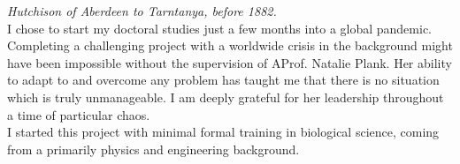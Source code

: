 \documentclass[
  a4paper,
]{scrbook}
\begin{document}
\textit{Hutchison of Aberdeen to Tarntanya, before 1882.} \\[5pt] 
I chose to start my doctoral studies just a few months into a global pandemic. Completing a challenging project with a worldwide crisis in the background might have been impossible without the supervision of AProf. Natalie Plank. Her ability to adapt to and overcome any problem has taught me that there is no situation which is truly unmanageable. I am deeply grateful for her leadership throughout a time of particular chaos. \\[5pt] I started this project with minimal formal training in biological science, coming from a primarily physics and engineering background. 
\newpage
\fancyhf{} %
\thispagestyle{fancy} %
\renewcommand{\headrulewidth}{0pt}
\fancyfoot[L]{\thepage} %
\end{document}
